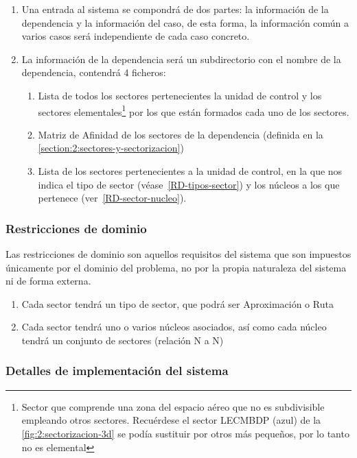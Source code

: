 \begin{enumerate}[label={\textbf{RIO\arabic*}}]
	\item  Una entrada al sistema se compondrá de dos partes: la información de la dependencia y la información del caso,
	de esta forma, la información común a varios casos será independiente de cada caso concreto.
	\item La información de la dependencia será un subdirectorio con el nombre de la dependencia, contendrá 4 ficheros:
	\begin{enumerate}[label*={\textbf{.\arabic*}}]
		\item  Lista de todos los sectores pertenecientes la unidad de control y los sectores elementales\footnote{
			Sector que comprende una zona del espacio aéreo que no es subdivisible empleando otros sectores. Recuérdese el sector LECMBDP (azul) de la \autoref{fig:2:sectorizacion-3d} se podía sustituir por otros más pequeños, por lo tanto no es elemental
		} por los que están formados cada uno de los sectores.
		
		\item  Matriz de Afinidad de los sectores de la dependencia (definida en la 	\autoref{section:2:sectores-y-sectorizacion})
		\item Lista de los sectores pertenecientes a la unidad de control, en la que nos indica el tipo de sector (véase~\ref{RD-tipos-sector}) y los núcleos a los que pertenece (ver~\ref{RD-sector-nucleo}).
	\end{enumerate}
	
\end{enumerate}


\subsubsection{Restricciones de dominio}
Las restricciones de dominio son aquellos requisitos del sistema que son impuestos únicamente por el dominio del problema, no por la propia naturaleza del sistema ni de forma externa.

\begin{enumerate}[label={\textbf{RD\arabic*}}]
	\item \label{RD:tipos-sector}  Cada sector tendrá un tipo de sector, que podrá ser Aproximación o Ruta
	\item  \label{RD:sector-nucleo} Cada sector tendrá uno o varios núcleos asociados, así como cada núcleo tendrá un conjunto de sectores (relación N a N)
	
\end{enumerate}

\subsubsection{Detalles de implementación del sistema}
\label{sec:detalles-impl-sistema}
